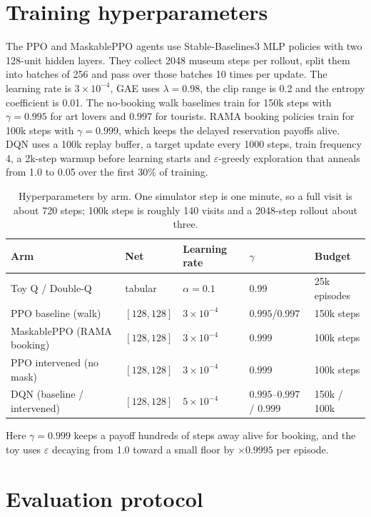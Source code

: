 \documentclass[11pt]{article}
\numberwithin{equation}{section} %
\newcommand{\added}[1]{{\color{green!50!black}#1}}
\begin{document}
\section{Training hyperparameters}
\label{app:hparams}

The PPO and MaskablePPO agents use Stable-Baselines3 MLP policies with two 128-unit hidden layers. They
collect 2048 museum steps per rollout, split them into batches of 256 and pass over those batches 10 times per
update. The learning rate is $3\times10^{-4}$, GAE uses $\lambda=0.98$, the clip range is 0.2 and the entropy
coefficient is 0.01. The no-booking walk baselines train for 150k steps with $\gamma=0.995$ for art lovers and
$0.997$ for tourists. RAMA booking policies train for 100k steps with $\gamma=0.999$, which keeps the delayed
reservation payoffs alive. DQN uses a 100k replay buffer, a target update every 1000 steps, train frequency 4,
a 2k-step warmup before learning starts and \added{$\varepsilon$-greedy exploration that anneals from 1.0 to
0.05 over the first 30\% of training.}

\begin{table}[h]
\centering
\small
\caption{Hyperparameters by arm. One simulator step is one minute, so a full visit is about 720 steps; 100k
steps is roughly 140 visits and a 2048-step rollout about three.}
\label{tab:hparams}
\begin{tabular}{lllll}
\toprule
Arm & Net & Learning rate & $\gamma$ & Budget \\
\midrule
Toy Q / Double-Q & tabular & $\alpha=0.1$ & $0.99$ & 25k episodes \\
PPO baseline (walk) & $[128,128]$ & $3\times10^{-4}$ & $0.995$/$0.997$ & 150k steps \\
MaskablePPO (RAMA booking) & $[128,128]$ & $3\times10^{-4}$ & $0.999$ & 100k steps \\
PPO intervened (no mask) & $[128,128]$ & $3\times10^{-4}$ & $0.999$ & 100k steps \\
DQN (baseline / intervened) & $[128,128]$ & $5\times10^{-4}$ & $0.995$--$0.997$ / $0.999$ & 150k / 100k \\
\bottomrule
\end{tabular}
\end{table}

Here $\gamma=0.999$ keeps a payoff hundreds of steps away alive for booking, and the toy uses $\varepsilon$
decaying from 1.0 toward a small floor by $\times0.9995$ per episode.

\section{Evaluation protocol}
\label{app:eval}
\end{document}

